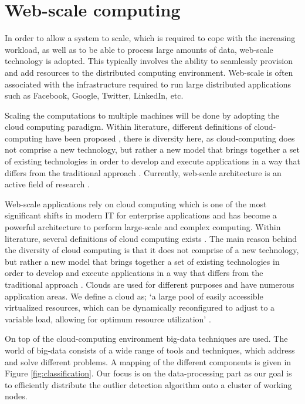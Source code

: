 \section{Web-scale computing \label{sec2:webscale}}

In order to allow a system to scale, which is required to cope with the increasing workload, as well as to be able to process large amounts of data, web-scale technology is adopted. This typically involves the ability to seamlessly provision and add resources to the distributed computing environment. Web-scale is often associated with the infrastructure required to run large distributed applications such as Facebook, Google, Twitter, LinkedIn, etc. 

Scaling the computations to multiple machines will be done by adopting the cloud computing paradigm. Within literature, different definitions of cloud-computing have been proposed \cite{clouddef}, there is diversity here, as cloud-computing does not comprise a new technology, but rather a new model that brings together a set of existing technologies in order to develop and execute applications in a way that differs from the traditional approach \cite{zhang:cloud}. Currently, web-scale architecture is an active field of research \cite{cherniack2003scalable}.

Web-scale applications rely on cloud computing which is one of the most significant shifts in modern IT for enterprise applications and has become a powerful architecture to perform large-scale and complex computing. Within literature, several definitions of cloud computing exists \cite{sathyavani}. The main reason behind the diversity of cloud computing is that it does not comprise of a new technology, but rather a new model that brings together a set of existing technologies in order to develop and execute applications in a way that differs from the traditional approach \cite{zhang:cloud}. Clouds are used for different purposes and have numerous application areas. We define a cloud as; `a large pool of easily accessible virtualized resources, which can be dynamically reconfigured to adjust to a variable load, allowing for optimum resource utilization' \cite{Vaquero:2008:BCT:1496091.1496100}. 

On top of the cloud-computing environment big-data techniques are used. The world of big-data consists of a wide range of tools and techniques, which address and solve different problems. A mapping of the different components is given in Figure \ref{fig:classification}. Our focus is on the data-processing part as our goal is to efficiently distribute the outlier detection algorithm onto a cluster of working nodes.

